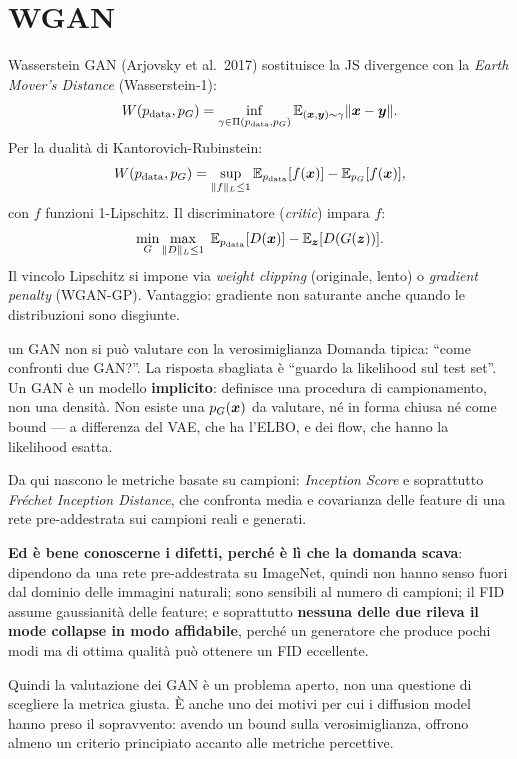 \section{WGAN}

Wasserstein GAN (Arjovsky et al.\ 2017) sostituisce la JS divergence con la \emph{Earth Mover's Distance} (Wasserstein-1):
\[
W(p_{\text{data}}, p_G) = \inf_{\gamma \in \Pi(p_{\text{data}}, p_G)} \mathbb{E}_{(\bm{x},\bm{y})\sim \gamma}\|\bm{x}-\bm{y}\|.
\]
Per la dualità di Kantorovich-Rubinstein:
\[
W(p_{\text{data}}, p_G) = \sup_{\|f\|_L \leq 1} \mathbb{E}_{p_{\text{data}}}[f(\bm{x})] - \mathbb{E}_{p_G}[f(\bm{x})],
\]
con $f$ funzioni 1-Lipschitz. Il discriminatore (\emph{critic}) impara $f$:
\[
\min_G \max_{\|D\|_L \leq 1}\; \mathbb{E}_{p_{\text{data}}}[D(\bm{x})] - \mathbb{E}_{\bm{z}}[D(G(\bm{z}))].
\]
Il vincolo Lipschitz si impone via \emph{weight clipping} (originale, lento) o \emph{gradient penalty} (WGAN-GP). Vantaggio: gradiente non saturante anche quando le distribuzioni sono disgiunte.

\begin{trappola}{un GAN non si può valutare con la verosimiglianza}
Domanda tipica: ``come confronti due GAN?''. La risposta sbagliata è ``guardo la likelihood sul test set''. Un GAN è un modello \textbf{implicito}: definisce una procedura di campionamento, non una densità. Non esiste una $p_G(\bm{x})$ da valutare, né in forma chiusa né come bound — a differenza del VAE, che ha l'ELBO, e dei flow, che hanno la likelihood esatta.

Da qui nascono le metriche basate su campioni: \emph{Inception Score} e soprattutto \emph{Fréchet Inception Distance}, che confronta media e covarianza delle feature di una rete pre-addestrata sui campioni reali e generati.

\textbf{Ed è bene conoscerne i difetti, perché è lì che la domanda scava}: dipendono da una rete pre-addestrata su ImageNet, quindi non hanno senso fuori dal dominio delle immagini naturali; sono sensibili al numero di campioni; il FID assume gaussianità delle feature; e soprattutto \textbf{nessuna delle due rileva il mode collapse in modo affidabile}, perché un generatore che produce pochi modi ma di ottima qualità può ottenere un FID eccellente.

Quindi la valutazione dei GAN è un problema aperto, non una questione di scegliere la metrica giusta. È anche uno dei motivi per cui i diffusion model hanno preso il sopravvento: avendo un bound sulla verosimiglianza, offrono almeno un criterio principiato accanto alle metriche percettive.
\end{trappola}

